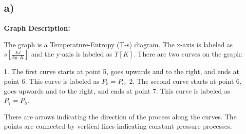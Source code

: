 

\subsection*{a)}

\begin{center}
\textbf{Graph Description:}
\end{center}

The graph is a Temperature-Entropy (T-s) diagram. The x-axis is labeled as $s \left[\frac{kJ}{kg \cdot K}\right]$ and the y-axis is labeled as $T \left[K\right]$. There are two curves on the graph:

1. The first curve starts at point 5, goes upwards and to the right, and ends at point 6. This curve is labeled as $P_5 = P_6$.
2. The second curve starts at point 6, goes upwards and to the right, and ends at point 7. This curve is labeled as $P_7 = P_8$.

There are arrows indicating the direction of the process along the curves. The points are connected by vertical lines indicating constant pressure processes.
